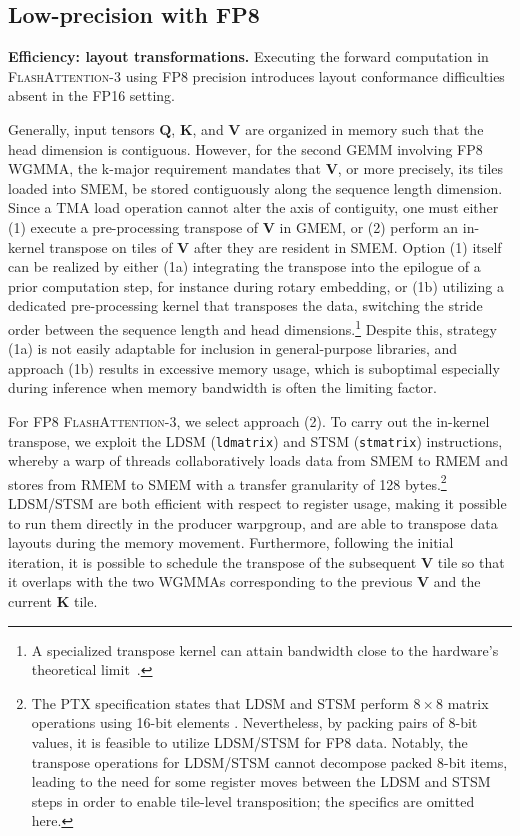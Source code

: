 \subsection{Low-precision with FP8}
\label{sec:algofp8}

\textbf{Efficiency: layout transformations.} Executing the forward computation in \textsc{FlashAttention-3} using FP8 precision introduces layout conformance difficulties absent in the FP16 setting.

Generally, input tensors $\mathbf{Q}$, $\mathbf{K}$, and $\mathbf{V}$ are organized in memory such that the head dimension is contiguous. However, for the second GEMM involving FP8 WGMMA, the k-major requirement mandates that $\mathbf{V}$, or more precisely, its tiles loaded into SMEM, be stored contiguously along the sequence length dimension. Since a TMA load operation cannot alter the axis of contiguity, one must either (1) execute a pre-processing transpose of $\mathbf{V}$ in GMEM, or (2) perform an in-kernel transpose on tiles of $\mathbf{V}$ after they are resident in SMEM. Option (1) itself can be realized by either (1a) integrating the transpose into the epilogue of a prior computation step, for instance during rotary embedding, or (1b) utilizing a dedicated pre-processing kernel that transposes the data, switching the stride order between the sequence length and head dimensions.\footnote{A specialized transpose kernel can attain bandwidth close to the hardware’s theoretical limit~\citep{colfax_cutlass_transpose_2024}.} Despite this, strategy (1a) is not easily adaptable for inclusion in general-purpose libraries, and approach (1b) results in excessive memory usage, which is suboptimal especially during inference when memory bandwidth is often the limiting factor.

For FP8 \textsc{FlashAttention-3}, we select approach (2). To carry out the in-kernel transpose, we exploit the LDSM (\verb|ldmatrix|) and STSM (\verb|stmatrix|) instructions, whereby a warp of threads collaboratively loads data from SMEM to RMEM and stores from RMEM to SMEM with a transfer granularity of 128 bytes.\footnote{The PTX specification states that LDSM and STSM perform $8 \times 8$ matrix operations using 16-bit elements \cite[\S 9.7.13.4.15-16]{ptx}. Nevertheless, by packing pairs of 8-bit values, it is feasible to utilize LDSM/STSM for FP8 data. Notably, the transpose operations for LDSM/STSM cannot decompose packed 8-bit items, leading to the need for some register moves between the LDSM and STSM steps in order to enable tile-level transposition; the specifics are omitted here.} LDSM/STSM are both efficient with respect to register usage, making it possible to run them directly in the producer warpgroup, and are able to transpose data layouts during the memory movement. Furthermore, following the initial iteration, it is possible to schedule the transpose of the subsequent $\mathbf{V}$ tile so that it overlaps with the two WGMMAs corresponding to the previous $\mathbf{V}$ and the current $\mathbf{K}$ tile.

